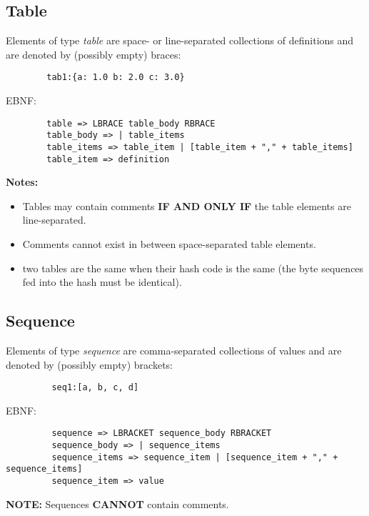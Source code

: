 \documentclass{memarticle}
\begin{document}
{                \subsection{Table}
                        Elements of type \emph{table} 
                        are space- or line-separated collections of definitions 
                        and are denoted by (possibly empty) braces:
                        \begin{verbatim}
        tab1:{a: 1.0 b: 2.0 c: 3.0}
                        \end{verbatim}
                        EBNF:
                        \begin{verbatim}
        table => LBRACE table_body RBRACE
        table_body => | table_items
        table_items => table_item | [table_item + "," + table_items]
        table_item => definition
                        \end{verbatim}
                        \par
                        \textbf{ Notes: }
                        \begin{itemize}
                                \item Tables may contain comments \textbf{ IF AND ONLY IF } 
                                                the table elements are line-separated. 
                                \item Comments cannot exist in between space-separated table elements.
                                \item two tables are the same when their hash code is the same 
                                                (the byte sequences fed into the hash must be identical).
                        \end{itemize}
                \subsection{Sequence}
                        Elements of type \emph{sequence} 
                        are comma-separated collections of values 
                        and are denoted by (possibly empty) brackets:
                        \begin{verbatim}
         seq1:[a, b, c, d]
                        \end{verbatim}
                        EBNF:
                        \begin{verbatim}
         sequence => LBRACKET sequence_body RBRACKET
         sequence_body => | sequence_items
         sequence_items => sequence_item | [sequence_item + "," + sequence_items]
         sequence_item => value
                        \end{verbatim}
                        \par
                        \textbf{ NOTE: } Sequences \textbf{ CANNOT } contain comments.
                \newpage
}
\end{document}
